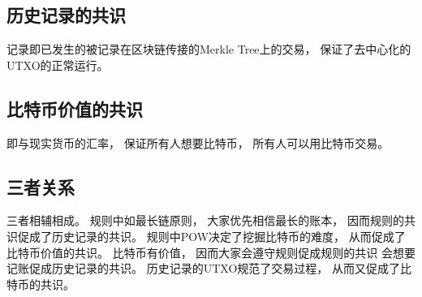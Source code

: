 \documentclass[UTF8,12pt]{article}
\begin{document}
    \subsection{历史记录的共识}
    记录即已发生的被记录在区块链传接的Merkle Tree上的交易，
    保证了去中心化的UTXO的正常运行。
    \subsection{比特币价值的共识}
    即与现实货币的汇率，
    保证所有人想要比特币，
    所有人可以用比特币交易。
    \subsection{三者关系}
    三者相辅相成。
    规则中如最长链原则，
    大家优先相信最长的账本，
    因而规则的共识促成了历史记录的共识。
    规则中POW决定了挖掘比特币的难度，
    从而促成了比特币价值的共识。
    比特币有价值，
    因而大家会遵守规则促成规则的共识
    会想要记账促成历史记录的共识。
    历史记录的UTXO规范了交易过程，
    从而又促成了比特币的共识。
\end{document}

